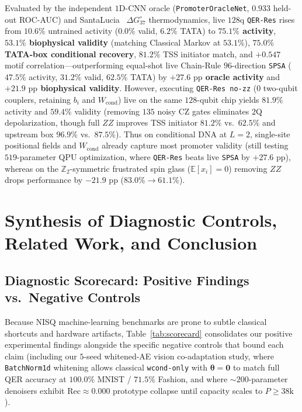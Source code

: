 \documentclass[11pt]{article}
\begin{document}
Evaluated by the independent $1$D-CNN oracle (\texttt{PromoterOracleNet}, $0.933$ held-out ROC-AUC) and SantaLucia~\cite{santalucia1998dna} $\Delta G^\circ_{37}$ thermodynamics, live $128$q \texttt{QER-Res} rises from $10.6\%$ untrained activity ($0.0\%$ valid, $6.2\%$ TATA) to \textbf{$75.1\%$ activity}, \textbf{$53.1\%$ biophysical validity} (matching Classical Markov at $53.1\%$), \textbf{$75.0\%$ TATA-box conditional recovery}, $81.2\%$ TSS initiator match, and $+0.547$ motif correlation—outperforming equal-shot live Chain-Rule $96$-direction \texttt{SPSA} ($47.5\%$ activity, $31.2\%$ valid, $62.5\%$ TATA) by \textbf{$+27.6\text{ pp}$ oracle activity} and \textbf{$+21.9\text{ pp}$ biophysical validity}. However, executing \texttt{QER-Res no-zz} ($0$ two-qubit couplers, retaining $b_i$ and $W_{\text{cond}}$) live on the same $128$-qubit chip yields $81.9\%$ activity and $59.4\%$ validity (removing $135$ noisy CZ gates eliminates $2$Q depolarization, though full $ZZ$ improves TSS initiator $81.2\%$ vs.\ $62.5\%$ and upstream box $96.9\%$ vs.\ $87.5\%$). Thus on conditional DNA at $L{=}2$, single-site positional fields and $W_{\text{cond}}$ already capture most promoter validity (still testing $519$-parameter QPU optimization, where \texttt{QER-Res} beats live \texttt{SPSA} by $+27.6\text{ pp}$), whereas on the $\mathbb{Z}_2$-symmetric frustrated spin glass ($\mathbb{E}[x_i]{=}0$) removing $ZZ$ drops performance by $-21.9\text{ pp}$ ($83.0\%{\to}61.1\%$).

\section{Synthesis of Diagnostic Controls, Related Work, and Conclusion}
\label{sec:discussion}

\subsection{Diagnostic Scorecard: Positive Findings vs.\ Negative Controls}
Because NISQ machine-learning benchmarks are prone to subtle classical shortcuts and hardware artifacts, Table~\ref{tab:scorecard} consolidates our positive experimental findings alongside the specific negative controls that bound each claim (including our $5$-seed whitened-AE vision co-adaptation study, where \texttt{BatchNorm1d} whitening allows classical \texttt{wcond-only} with $\boldsymbol{\theta}{=}\mathbf{0}$ to match full QER accuracy at $100.0\%$ MNIST / $71.5\%$ Fashion, and where $\sim 200$-parameter denoisers exhibit $\text{Rec}\approx 0.000$ prototype collapse until capacity scales to $P\ge 38\text{k}$).
\end{document}
